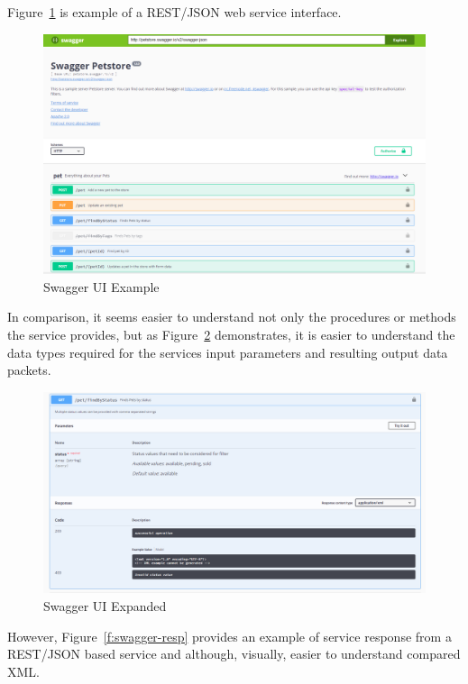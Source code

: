 Figure~\ref{f:swaggerui-example}\cite{swaggerio2018} is example of a REST/JSON web service
interface.  
\begin{figure}[!ht]
  \centering\includegraphics[width=\columnwidth]{images/swaggerui.png}
  \caption{Swagger UI Example}\label{f:swaggerui-example}
\end{figure}
In comparison, it seems easier to understand not only the procedures
or methods the service provides, but as Figure~\ref{f:swaggerui-expansion}\cite{swaggerio2018}
demonstrates, it is easier to understand the data types required for the services input
parameters and resulting output data packets.  
\begin{figure}[!ht]
  \centering\includegraphics[width=\columnwidth]{images/swaggerui-expansion.png}
  \caption{Swagger UI Expanded}\label{f:swaggerui-expansion}
\end{figure}
However, Figure~\ref{f:swagger-resp}\cite{swaggerresp2018} provides an example 
of service response from a REST/JSON based service and although, visually, 
easier to understand compared XML.  
